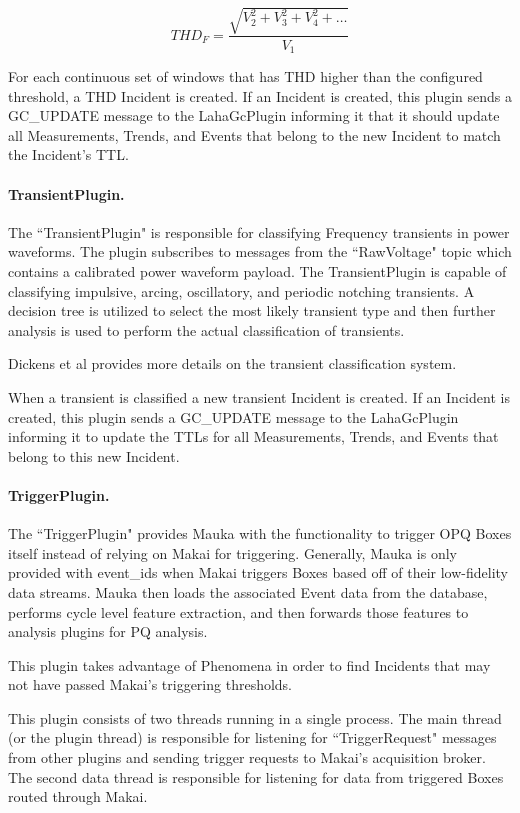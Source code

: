 \begin{equation}
\label{equation:Thd}
	THD_F = \frac{\sqrt{V_2^2 + V_3^2 + V_4^2 + \dots}}{V_1}
\end{equation}

For each continuous set of windows that has THD higher than the configured threshold, a THD Incident is created. If an Incident is created, this plugin sends a GC\_UPDATE message to the LahaGcPlugin informing it that it should update all Measurements, Trends, and Events that belong to the new Incident to match the Incident's TTL\@.


\paragraph{TransientPlugin.}
The ``TransientPlugin" is responsible for classifying Frequency transients in power waveforms. The plugin subscribes to messages from the ``RawVoltage" topic which contains a calibrated power waveform payload. The TransientPlugin is capable of classifying impulsive, arcing, oscillatory, and periodic notching transients. A decision tree is utilized to select the most likely transient type and then further analysis is used to perform the actual classification of transients.

Dickens et al\cite{csdl2-19-02} provides more details on the transient classification system.

When a transient is classified a new transient Incident is created. If an Incident is created, this plugin sends a GC\_UPDATE message to the LahaGcPlugin informing it to update the TTLs for all Measurements, Trends, and Events that belong to this new Incident.

\paragraph{TriggerPlugin.}\label{sec:trigger_plugin}
The ``TriggerPlugin" provides Mauka with the functionality to trigger OPQ Boxes itself instead of relying on Makai for triggering. Generally, Mauka is only provided with event\_ids when Makai triggers Boxes based off of their low-fidelity data streams. Mauka then loads the associated Event data from the database, performs cycle level feature extraction, and then forwards those features to analysis plugins for PQ analysis.

This plugin takes advantage of Phenomena in order to find Incidents that may not have passed Makai's triggering thresholds.

This plugin consists of two threads running in a single process. The main thread (or the plugin thread) is responsible for listening for ``TriggerRequest" messages from other plugins and sending trigger requests to Makai's acquisition broker. The second data thread is responsible for listening for data from triggered Boxes routed through Makai.

